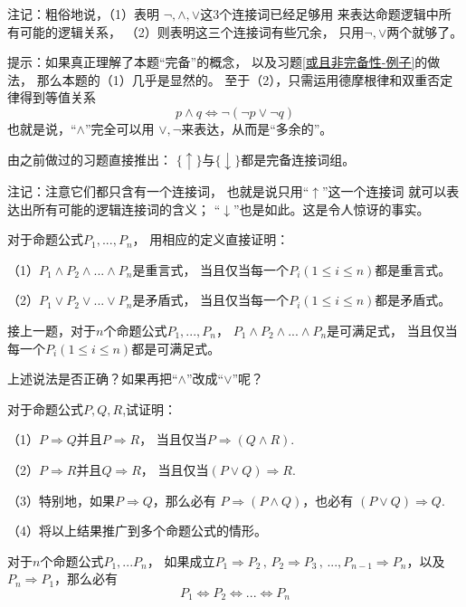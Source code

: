 注记：粗俗地说，（1）表明
$\neg,\wedge,\vee$这3个连接词已经足够用
来表达命题逻辑中所有可能的逻辑关系，
（2）则表明这三个连接词有些冗余，
只用$\neg,\vee$两个就够了。\vs

提示：如果真正理解了本题“完备”的概念，
以及习题\ref{或且非完备性-例子}的做法，
那么本题的（1）几乎是显然的。
至于（2），只需运用德摩根律和双重否定律得到等值关系
$$p\wedge q\Leftrightarrow\neg(\neg p\vee\neg q)$$
也就是说，“$\wedge$”完全可以用
$\vee,\neg$来表达，从而是“多余的”。\vs

\begin{prob}
由之前做过的习题直接推出：
$\{\uparrow\}$与$\{\downarrow\}$都是完备连接词组。
\end{prob}

注记：注意它们都只含有一个连接词，
也就是说只用“$\uparrow$”这一个连接词
就可以表达出所有可能的逻辑连接词的含义；
“$\downarrow$”也是如此。这是令人惊讶的事实。\vs

\begin{prob}对于命题公式$P_1,...,P_n$，
用相应的定义直接证明：

（1）$P_1\wedge P_2\wedge...\wedge P_n$是重言式，
当且仅当每一个$P_i(1\leq i\leq n)$都是重言式。

（2）$P_1\vee P_2\vee...\vee P_n$是矛盾式，
当且仅当每一个$P_i(1\leq i\leq n)$都是矛盾式。
\end{prob}\vs

\begin{prob}接上一题，对于$n$个命题公式$P_1,...,P_n$，
$P_1\wedge P_2\wedge...\wedge P_n$是可满足式，
当且仅当每一个$P_i(1\leq i\leq n)$都是可满足式。

上述说法是否正确？如果再把“$\wedge$”改成“$\vee$”呢？
\end{prob}\vs

\begin{prob}对于命题公式$P,Q,R$,试证明：

（1）$P\Rightarrow Q$并且$P\Rightarrow R$，
当且仅当$P\Rightarrow(Q\wedge R)$.

（2）$P\Rightarrow R$并且$Q\Rightarrow R$，
当且仅当$(P\vee Q)\Rightarrow R$.

（3）特别地，如果$P\Rightarrow Q$，那么必有
$P\Rightarrow(P\wedge Q)$，也必有
$(P\vee Q)\Rightarrow Q$.

（4）将以上结果推广到多个命题公式的情形。
\end{prob}\vs

\begin{prob}[循环论证]
对于$n$个命题公式$P_1,...P_n$，
如果成立$P_1\Rightarrow P_2\,,\,P_2\Rightarrow P_3\,,\,...,
P_{n-1}\Rightarrow P_n$，以及$P_n\Rightarrow P_1$，那么必有
$$P_1\Leftrightarrow P_2
\Leftrightarrow...\Leftrightarrow P_n$$
\end{prob}\vs

